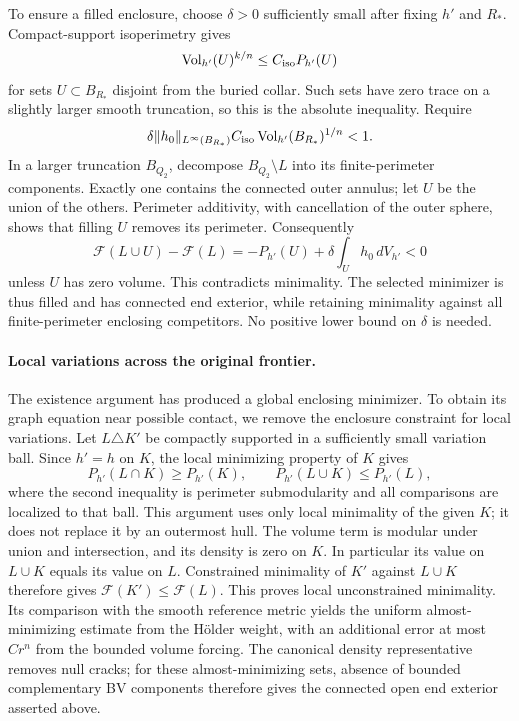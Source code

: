 To ensure a filled enclosure, choose $\delta>0$ sufficiently small
after fixing $h'$ and $R_*$. Compact-support isoperimetry gives
\[
 \operatorname{Vol}_{h'}(U)^{k/n}\le C_{\rm iso}P_{h'}(U)
\]
for sets $U\subset B_{R_*}$ disjoint from the buried collar. Such
sets have zero trace on a slightly larger smooth truncation, so
this is the absolute inequality. Require
\[
 \delta\|h_0\|_{L^\infty(B_{R_*})}
 C_{\rm iso}\operatorname{Vol}_{h'}(B_{R_*})^{1/n}<1.
\]
In a larger truncation $B_{Q_2}$, decompose $B_{Q_2}\setminus L$
into its finite-perimeter components. Exactly one contains the
connected outer annulus; let $U$ be the union of the others.
Perimeter additivity, with cancellation of the outer sphere, shows
that filling $U$ removes its perimeter. Consequently
\[
 \mathcal F(L\cup U)-\mathcal F(L)
 =-P_{h'}(U)+\delta\int_Uh_0\,dV_{h'}<0
\]
unless $U$ has zero volume. This contradicts minimality. The selected
minimizer is thus filled and has connected end exterior, while
retaining minimality against all finite-perimeter enclosing
competitors. No positive lower bound on $\delta$ is needed.

\paragraph{Local variations across the original frontier.}
The existence argument has produced a global enclosing minimizer.
To obtain its graph equation near possible contact, we remove the
enclosure constraint for local variations. Let $L\triangle K'$ be
compactly supported in a sufficiently small variation ball. Since
$h'=h$ on $K$, the local minimizing property of $K$ gives
\[
 P_{h'}(L\cap K)\ge P_{h'}(K),\qquad
 P_{h'}(L\cup K)\le P_{h'}(L),
\]
where the second inequality is perimeter submodularity and all
comparisons are localized to that ball. This argument uses only local
minimality of the given $K$; it does not replace it by an outermost
hull.
The volume term is modular under union and intersection, and its
density is zero on $K$. In particular its value on $L\cup K$
equals its value on $L$. Constrained minimality of $K'$ against
$L\cup K$ therefore gives $\mathcal F(K')\le\mathcal F(L)$.
This proves local unconstrained minimality. Its comparison with the
smooth reference metric yields the uniform almost-minimizing estimate
from the H\"older weight, with an additional error at most $Cr^n$
from the bounded volume forcing.
The canonical density representative removes null cracks; for these
almost-minimizing sets, absence of bounded complementary BV components
therefore gives the connected open end exterior asserted above.


